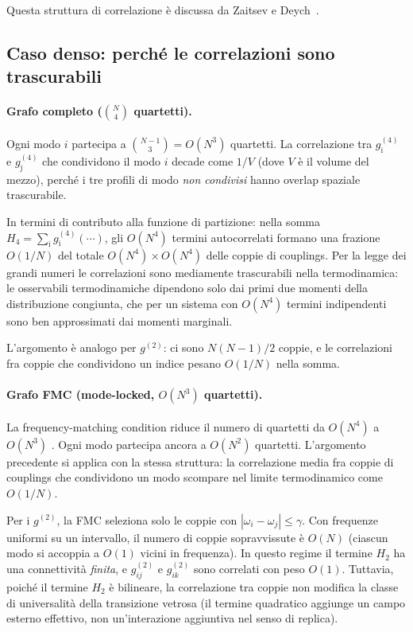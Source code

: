 \documentclass[11pt,a4paper]{article}
\begin{document}
Questa struttura di correlazione \`e discussa da Zaitsev e
Deych~\cite{Zaitsev2010}.

\subsection{Caso denso: perch\'e le correlazioni sono trascurabili}

\paragraph{Grafo completo ($\binom{N}{4}$ quartetti).}
Ogni modo $i$ partecipa a $\binom{N-1}{3} = O(N^3)$ quartetti.
La correlazione tra $g^{(4)}_{\bar\imath}$ e $g^{(4)}_{\bar\jmath}$
che condividono il modo $i$ decade come $1/V$ (dove $V$ \`e il volume
del mezzo), perch\'e i tre profili di modo \emph{non condivisi} hanno
overlap spaziale trascurabile.

In termini di contributo alla funzione di partizione: nella somma
$H_4 = \sum_{\bar\imath} g^{(4)}_{\bar\imath} (\cdots)$, gli
$O(N^4)$ termini autocorrelati formano una frazione $O(1/N)$ del totale
$O(N^4) \times O(N^4)$ delle coppie di couplings. Per la legge dei
grandi numeri le correlazioni sono media\-mente trascurabili nella
termodinamica: le osservabili termodinamiche dipendono solo dai primi
due momenti della distribuzione congiunta, che per un sistema con
$O(N^4)$ termini indipendenti sono ben approssimati dai momenti
marginali.

L'argomento \`e analogo per $g^{(2)}$: ci sono $N(N-1)/2$ coppie, e
le correlazioni fra coppie che condividono un indice pesano $O(1/N)$
nella somma.

\paragraph{Grafo FMC (mode-locked, $O(N^3)$ quartetti).}
La frequency-matching condition riduce il numero di quartetti da
$O(N^4)$ a $O(N^3)$ \cite{Marruzzo2018}. Ogni modo partecipa ancora a
$O(N^2)$ quartetti. L'argomento precedente si applica con la stessa
struttura: la correlazione media fra coppie di couplings che condividono
un modo scompare nel limite termodinamico come $O(1/N)$.

Per i $g^{(2)}$, la FMC seleziona solo le coppie con
$|\omega_i - \omega_j| \le \gamma$. Con frequenze uniformi su un
intervallo, il numero di coppie sopravvissute \`e $O(N)$ (ciascun modo
si accoppia a $O(1)$ vicini in frequenza). In questo regime il termine
$H_2$ ha una connettivit\`a \emph{finita}, e $g^{(2)}_{ij}$ e
$g^{(2)}_{ik}$ sono correlati con peso $O(1)$.
Tuttavia, poich\'e il termine $H_2$ \`e bilineare, la correlazione
tra coppie non modifica la classe di universalit\`a della transizione
vetrosa (il termine quadratico aggiunge un campo esterno effettivo,
non un'interazione aggiuntiva nel senso di replica).
\end{document}
